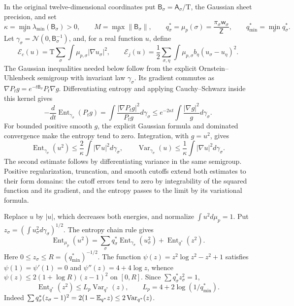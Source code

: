 In the original twelve-dimensional coordinates put
\(\mathsf B_\sigma=\mathsf A_\sigma/\mathrm T\), the Gaussian sheet
precision, and set
\[
 \kappa=\min_\sigma\lambda_{\min}(\mathsf B_\sigma)>0,\qquad
 M=\max_\sigma\|\mathsf B_\sigma\|,\qquad
 q_\sigma^*=\mu_p(\sigma)
 =\frac{\pi_\sigma\mathsf w_\sigma}{\mathsf Z},
 \qquad q_{\min}^*=\min_\sigma q_\sigma^*.
\]
Let \(\gamma_\sigma=\mathcal N(0,\mathsf B_\sigma^{-1})\), and, for a
real function \(u\), define
\[
 \mathscr E_c(u)=\mathrm T\sum_\sigma\int\mu_{p,\sigma}|\nabla u_\sigma|^2,
 \qquad
 \mathscr E_j(u)=\frac12\sum_{\sigma,\eta}\int\mu_{p,\sigma}b_\eta
                                    (u_\sigma-u_\eta)^2.
\]
The Gaussian inequalities needed below follow from the explicit
Ornstein--Uhlenbeck semigroup with invariant law \(\gamma_\sigma\).
Its gradient commutes as
\(\nabla P_tg=e^{-t\mathsf B_\sigma}P_t\nabla g\). Differentiating
entropy and applying Cauchy--Schwarz inside this kernel gives
\[
 -\frac d{dt}\operatorname{Ent}_{\gamma_\sigma}(P_tg)
 =\int\frac{|\nabla P_tg|^2}{P_tg}d\gamma_\sigma
 \le e^{-2\kappa t}\int\frac{|\nabla g|^2}{g}d\gamma_\sigma.
\]
For bounded positive smooth \(g\), the explicit Gaussian formula and
dominated convergence make the entropy tend to zero. Integration, with
\(g=u^2\), gives
\begin{equation}
 \operatorname{Ent}_{\gamma_\sigma}(u^2)
 \le\frac2\kappa\int|\nabla u|^2d\gamma_\sigma,
 \qquad
 \operatorname{Var}_{\gamma_\sigma}(u)
 \le\frac1\kappa\int|\nabla u|^2d\gamma_\sigma.
\label{eq:phil-selection-gaussian-inequalities}
\end{equation}
The second estimate follows by differentiating variance in the same
semigroup. Positive regularization, truncation, and smooth cutoffs extend
both estimates to their form domains: the cutoff errors tend to zero by
integrability of the squared function and its gradient, and the entropy
passes to the limit by its variational formula.

Replace \(u\) by \(|u|\), which decreases both energies, and normalize
\(\int u^2d\mu_p=1\). Put
\(z_\sigma=(\int u_\sigma^2d\gamma_\sigma)^{1/2}\).
The entropy chain rule gives
\[
 \operatorname{Ent}_{\mu_p}(u^2)
 =\sum_\sigma q_\sigma^*
             \operatorname{Ent}_{\gamma_\sigma}(u_\sigma^2)
       +\operatorname{Ent}_{q^*}(z^2).
\]
Here \(0\le z_\sigma\le R=(q_{\min}^*)^{-1/2}\).
The function \(\psi(z)=z^2\log z^2-z^2+1\) satisfies
\(\psi(1)=\psi'(1)=0\) and \(\psi''(z)=4+4\log z\), whence
\(\psi(z)\le2(1+\log R)(z-1)^2\) on \([0,R]\).
Since \(\sum q_\sigma^*z_\sigma^2=1\),
\[
 \operatorname{Ent}_{q^*}(z^2)
 \le L_p\operatorname{Var}_{q^*}(z),\qquad
 L_p=4+2\log(1/q_{\min}^*).
\]
Indeed \(\sum q_\sigma^*(z_\sigma-1)^2
=2(1-\mathbb E_{q^*}z)\le2\operatorname{Var}_{q^*}(z)\).

